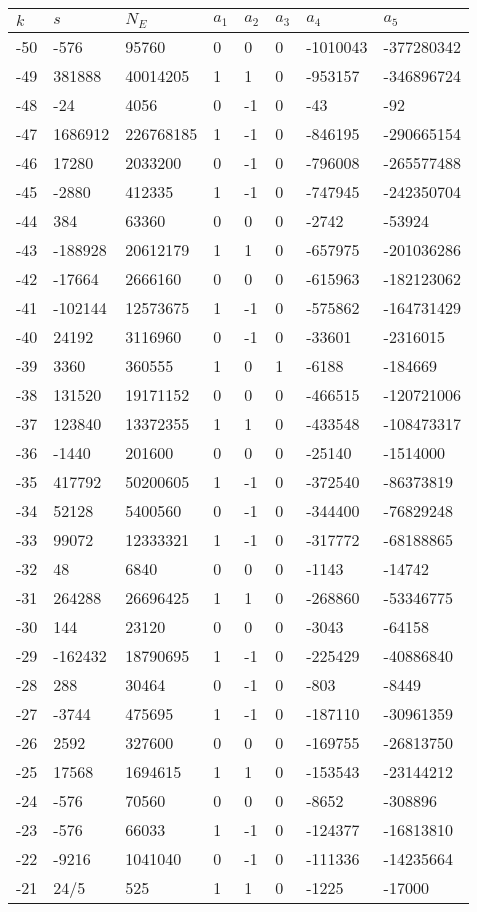 \documentclass{amsart}
\begin{document}
\begin{longtable}{|l|l|l|lllll|}
\hline
$k$ & $s$ & $N_E$ & $a_1$ & $a_2$ & $a_3$ & $a_4$ & $a_5$\\
\hline
-50&-576&95760&0&0&0&-1010043&-377280342\\
-49&381888&40014205&1&1&0&-953157&-346896724\\
-48&-24&4056&0&-1&0&-43&-92\\
-47&1686912&226768185&1&-1&0&-846195&-290665154\\
-46&17280&2033200&0&-1&0&-796008&-265577488\\
-45&-2880&412335&1&-1&0&-747945&-242350704\\
-44&384&63360&0&0&0&-2742&-53924\\
-43&-188928&20612179&1&1&0&-657975&-201036286\\
-42&-17664&2666160&0&0&0&-615963&-182123062\\
-41&-102144&12573675&1&-1&0&-575862&-164731429\\
-40&24192&3116960&0&-1&0&-33601&-2316015\\
-39&3360&360555&1&0&1&-6188&-184669\\
-38&131520&19171152&0&0&0&-466515&-120721006\\
-37&123840&13372355&1&1&0&-433548&-108473317\\
-36&-1440&201600&0&0&0&-25140&-1514000\\
-35&417792&50200605&1&-1&0&-372540&-86373819\\
-34&52128&5400560&0&-1&0&-344400&-76829248\\
-33&99072&12333321&1&-1&0&-317772&-68188865\\
-32&48&6840&0&0&0&-1143&-14742\\
-31&264288&26696425&1&1&0&-268860&-53346775\\
-30&144&23120&0&0&0&-3043&-64158\\
-29&-162432&18790695&1&-1&0&-225429&-40886840\\
-28&288&30464&0&-1&0&-803&-8449\\
-27&-3744&475695&1&-1&0&-187110&-30961359\\
-26&2592&327600&0&0&0&-169755&-26813750\\
-25&17568&1694615&1&1&0&-153543&-23144212\\
-24&-576&70560&0&0&0&-8652&-308896\\
-23&-576&66033&1&-1&0&-124377&-16813810\\
-22&-9216&1041040&0&-1&0&-111336&-14235664\\
-21&24/5&525&1&1&0&-1225&-17000\\

\end{longtable}
\end{document}
